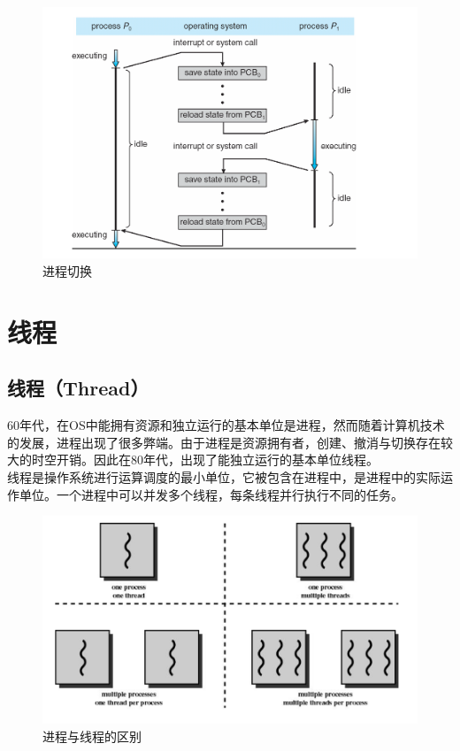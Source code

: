 \begin{figure}[H]
	\centering
	\includegraphics[scale=0.5]{img/C2/2-2/1.png}
	\caption{进程切换}
\end{figure}

\newpage

\section{线程}

\subsection{线程（Thread）}

60年代，在OS中能拥有资源和独立运行的基本单位是进程，然而随着计算机技术的发展，进程出现了很多弊端。由于进程是资源拥有者，创建、撤消与切换存在较大的时空开销。因此在80年代，出现了能独立运行的基本单位线程。 \\

线程是操作系统进行运算调度的最小单位，它被包含在进程中，是进程中的实际运作单位。一个进程中可以并发多个线程，每条线程并行执行不同的任务。

\begin{figure}[H]
	\centering
	\includegraphics[scale=0.6]{img/C2/2-3/1.png}
	\caption{进程与线程的区别}
\end{figure}

